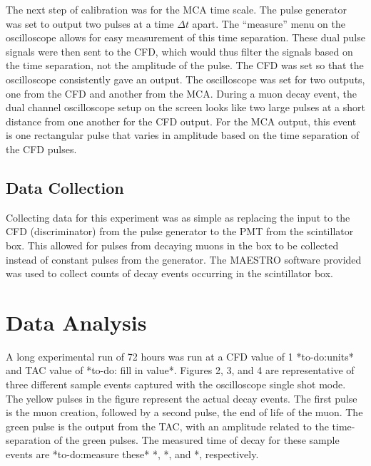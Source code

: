 \documentclass[%
 aip,
 amsmath,amssymb,
 reprint,%
floatfix,
]{revtex4-1}
\begin{document}
The next step of calibration was for the MCA time scale. The pulse generator was set to output two pulses at a time $\Delta t$ apart. The “measure” menu on the oscilloscope allows for easy measurement of this time separation. These dual pulse signals were then sent to the CFD, which would thus filter the signals based on the time separation, not the amplitude of the pulse. The CFD was set so that the oscilloscope consistently gave an output. The oscilloscope was set for two outputs, one from the CFD and another from the MCA. During a muon decay event, the dual channel oscilloscope setup on the screen looks like two large pulses at a short distance from one another for the CFD output. For the MCA output, this event is one rectangular pulse that varies in amplitude based on the time separation of the CFD pulses.

\subsection{Data Collection}

Collecting data for this experiment was as simple as replacing the input to the CFD (discriminator) from the pulse generator to the PMT from the scintillator box. This allowed for pulses from decaying muons in the box to be collected instead of constant pulses from the generator. The MAESTRO software provided was used to collect counts of decay events occurring in the scintillator box.

\section{\label{sec:level4}Data Analysis}

A long experimental run of 72 hours was run at a CFD value of 1 *to-do:units* and TAC value of *to-do: fill in value*. Figures 2, 3, and 4 are representative of three different sample events captured with the oscilloscope single shot mode. The yellow pulses in the figure represent the actual decay events. The first pulse is the muon creation, followed by a second pulse, the end of life of the muon. The green pulse is the output from the TAC, with an amplitude related to the time-separation of the green pulses. The measured time of decay for these sample events are *to-do:measure these* *, *, and *, respectively.
\end{document}
